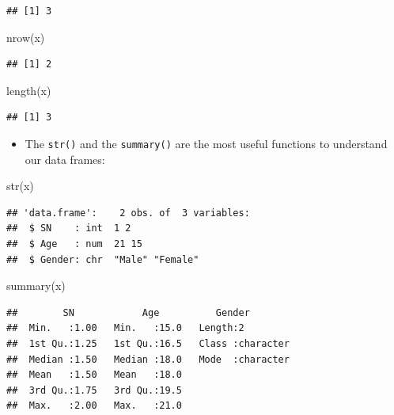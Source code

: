 \documentclass[
]{book}
\newenvironment{Shaded}{\begin{snugshade}}{\end{snugshade}}
\newcommand{\FunctionTok}[1]{\textcolor[rgb]{0.00,0.00,0.00}{#1}}
\newcommand{\NormalTok}[1]{#1}
\providecommand{\tightlist}{%
  \setlength{\itemsep}{0pt}\setlength{\parskip}{0pt}}
\begin{document}
\begin{verbatim}
## [1] 3
\end{verbatim}

\begin{Shaded}
\begin{Highlighting}[]
\FunctionTok{nrow}\NormalTok{(x)}
\end{Highlighting}
\end{Shaded}

\begin{verbatim}
## [1] 2
\end{verbatim}

\begin{Shaded}
\begin{Highlighting}[]
\FunctionTok{length}\NormalTok{(x)}
\end{Highlighting}
\end{Shaded}

\begin{verbatim}
## [1] 3
\end{verbatim}

\begin{itemize}
\tightlist
\item
  The \texttt{str()} and the \texttt{summary()} are the most useful functions to understand our data frames:
\end{itemize}

\begin{Shaded}
\begin{Highlighting}[]
\FunctionTok{str}\NormalTok{(x)}
\end{Highlighting}
\end{Shaded}

\begin{verbatim}
## 'data.frame':    2 obs. of  3 variables:
##  $ SN    : int  1 2
##  $ Age   : num  21 15
##  $ Gender: chr  "Male" "Female"
\end{verbatim}

\begin{Shaded}
\begin{Highlighting}[]
\FunctionTok{summary}\NormalTok{(x)}
\end{Highlighting}
\end{Shaded}

\begin{verbatim}
##        SN            Age          Gender         
##  Min.   :1.00   Min.   :15.0   Length:2          
##  1st Qu.:1.25   1st Qu.:16.5   Class :character  
##  Median :1.50   Median :18.0   Mode  :character  
##  Mean   :1.50   Mean   :18.0                     
##  3rd Qu.:1.75   3rd Qu.:19.5                     
##  Max.   :2.00   Max.   :21.0
\end{verbatim}
\end{document}
